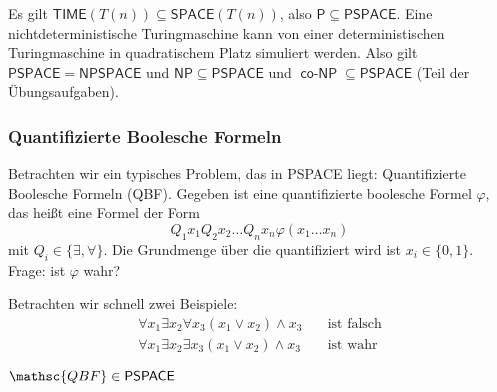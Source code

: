 \begin{Bem}
  \hspace{\parindent}Es gilt $\mathsf{TIME}(T(n)) \subseteq \mathsf{SPACE}(T(n))$, also $\mathsf{P} \subseteq \mathsf{PSPACE}$. Eine nichtdeterministische Turingmaschine kann von einer deterministischen Turingmaschine in quadratischem Platz simuliert werden. Also gilt $\mathsf{PSPACE} = \mathsf{NPSPACE}$ und $\mathsf{NP} \subseteq \mathsf{PSPACE}$ und $\operatorname{\mathsf{co-NP}} \subseteq \mathsf{PSPACE}$ (Teil der Übungsaufgaben).
\end{Bem}

\subsubsection{Quantifizierte Boolesche Formeln}
Betrachten wir ein typisches Problem, das in \textsf{PSPACE} liegt: Quantifizierte Boolesche Formeln (\textsc{QBF}). Gegeben ist eine quantifizierte boolesche Formel $\varphi$, das heißt eine Formel der Form
\[ Q_1 x_1 Q_2 x_2 \ldots Q_n x_n \varphi (x_1 \ldots x_n) \]
mit $Q_i \in \{\exists, \forall\}$. Die Grundmenge über die quantifiziert wird ist $x_i \in \{0, 1\}$. Frage: ist $\varphi$ wahr?

\begin{Bsp}
  \hspace{\parindent}Betrachten wir schnell zwei Beispiele:
  \begin{align*}
    \forall x_1 \exists x_2 \forall x_3 (x_1 \vee x_2) \wedge x_3 & \quad\text{ist falsch}\\
    \forall x_1 \exists x_2 \exists x_3 (x_1 \vee x_2) \wedge x_3 & \quad\text{ist wahr}
  \end{align*}
\end{Bsp}

\begin{Satz}
  \hspace{\parindent}$\mathsc{QBF} \in \mathsf{PSPACE}$
\end{Satz}

